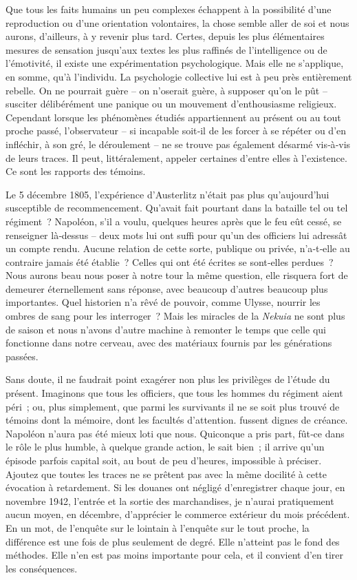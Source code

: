 \documentclass[french,twoside]{book} %
\begin{document}
\noindent Que tous les faits humains un peu complexes échappent à la possibilité d’une reproduction ou d’une orientation volontaires, la chose semble aller de soi et nous aurons, d’ailleurs, à y revenir plus tard. Certes, depuis les plus élémentaires mesures de sensation jusqu’aux textes les plus raffinés de l’intelligence ou de l’émotivité, il existe une expérimentation psycho­logique. Mais elle ne s’applique, en somme, qu’à l’individu. La psychologie collective lui est à peu près entièrement rebelle. On ne pourrait guère – on n’oserait guère, à supposer qu’on le pût – susciter délibérément une panique ou un mouvement d’enthousiasme religieux. Cependant lorsque les phénomènes étudiés appartiennent au présent ou au tout proche passé, l’observateur – si incapable soit‑il de les forcer à se répéter ou d’en infléchir, à son gré, le déroulement – ne se trouve pas également désarmé vis‑à‑vis de leurs traces. Il peut, littéralement, appeler certaines d’entre elles à l’existence. Ce sont les rapports des témoins.\par
\label{p22} Le 5 décembre 1805, l’expérience d’Austerlitz n’était pas plus qu’au­jourd’hui susceptible de recommencement. Qu’avait fait pourtant dans la bataille tel ou tel régiment ? Napoléon, s’il a voulu, quelques heures après que le feu eût cessé, se renseigner là‑dessus – deux mots lui ont suffi pour qu’un des officiers lui adressât un compte rendu. Aucune relation de cette sorte, publique ou privée, n’a‑t‑elle au contraire jamais été établie ? Celles qui ont été écrites se sont‑elles perdues ? Nous aurons beau nous poser à notre tour la même question, elle risquera fort de demeurer éter­nellement sans réponse, avec beaucoup d’autres beaucoup plus impor­tantes. Quel historien n’a rêvé de pouvoir, comme Ulysse, nourrir les ombres de sang pour les interroger ? Mais les miracles de la \emph{Nekuia} ne sont plus de saison et nous n’avons d’autre machine à remonter le temps que celle qui fonctionne dans notre cerveau, avec des matériaux fournis par les générations passées.\par
Sans doute, il ne faudrait point exagérer non plus les privilèges de l’étude du présent. Imaginons que tous les officiers, que tous les hommes du régiment aient péri ; ou, plus simplement, que parmi les survivants il ne se soit plus trouvé de témoins dont la mémoire, dont les facultés d’attention. fussent dignes de créance. Napoléon n’aura pas été mieux loti que nous. Quiconque a pris part, fût‑ce dans le rôle le plus humble, à quelque grande action, le sait bien ; il arrive qu’un épisode parfois capital soit, au bout de peu d’heures, impossible à préciser. Ajoutez que toutes les traces ne se prêtent pas avec la même docilité à cette évocation à retardement. Si les douanes ont négligé d’enregistrer chaque jour, en novembre 1942, l’entrée et la sortie des marchandises, je n’aurai prati­quement aucun moyen, en décembre, d’apprécier le commerce extérieur du mois précédent. En un mot, de l’enquête sur le lointain à l’enquête sur le tout proche, la différence est une fois de plus seulement de degré. Elle n’atteint pas le fond des méthodes. Elle n’en est pas moins impor­tante pour cela, et il convient d’en tirer les conséquences.\par
\end{document}
